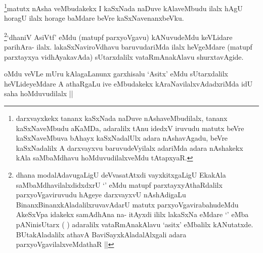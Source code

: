 \begin{artha}
\footnote{darxvayxkekx tananx kaSxNada naDuve nAshaveMbudilalx, tananx kaSxNaveMbudu aKaMDa, adaralilx tAnu idedxV iruvudu matutx beVre kaSxNaveMbuva bAhayx kaSxNadalUlx adara nAshavAgadu, beVre kaSxNadalilx A darxvayxvu baruvudeVyilalx adariMda adara nAshakekx kAla saMbaMdhavu hoMduvudilalxveMdu tAtapxyaR.}matutx nAsha veMbudakekx I kaSxNada naDuve kAlaveMbudu ilalx hAgU horagU ilalx horage baMdare beVre kaSxNavenanxbeVku.
\end{artha}

\begin{artha}
\footnote{dhana modalAdavugaLigU deVvasatAtxdi vayxkitxgaLigU EkakAla saMbaMdhavilalxdidxdxrU `\stext' eMdu matupf parxtayxyAthaRdalilx parxyoVgaviruvudu hAgeye darxvayxvU nAshAdigaLu BinanxBinanxkAladalilxruvavAdarU matutx parxyoVgavirabahudeMdu AkeSxVpa idakekx samAdhAna na- itAyxdi ililx lakaSxNa eMdare `\stext' eMba pANinisUtarx (  ) adaralilx vataRmAnakAlavu `asitx' eMbalilx kANutatxde. BUtakAladalilx athavA BaviSayxkAladalAlxgali adara parxyoVgavilalxveMdathaR ||}`dhaniV AsiVtf' eMdu (matupf parxyoVgavu) kANuvudeMdu keVLidare  parihAra- ilalx. lakaSxNaviroVdhavu baruvudariMda ilalx heVgeMdare (matupf parxtayxya vidhAyakavAda) sUtarxdalilx vataRmAnakAlavu shurxtavAgide.
\end{artha}

\begin{artha}
oMdu veVLe mUru kAlagaLanunx garxhisalu `Asitx' eMdu sUtarxdalilx heVLideyeMdare A athaRgaLu ive eMbudakekx kAraNavilalxvAdadxriMda idU saha hoMduvudilalx ||
\end{artha}

